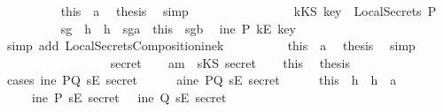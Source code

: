 \begin{isabellebody}
\ \ \ \ \ \ \ \ \isamarkupfalse%
\ this\ \ a{}\ \isamarkupfalse%
\ {\isacharquery}thesis\ \isamarkupfalse%
\ simp\isanewline
\ \ \ \ \ \ \isamarkupfalse%
\isanewline
\ \ \ \ \ \ \ \ \isamarkupfalse%
\ {\isachardoublequoteopen}kKS\ key\ {\isasymnotin}\ LocalSecrets\ P{\isachardoublequoteclose}\isanewline
\ \ \ \ \ \ \ \ \isamarkupfalse%
\ sg{}\ \ h{}\ \ h{}\ \ sg{}a\ \ this\ \ sg{}b\ \isamarkupfalse%
\ {\isachardoublequoteopen}ine\ P\ {\isacharparenleft}kE\ key{\isacharparenright}{\isachardoublequoteclose}\isanewline
\ \ \ \ \ \ \ \ \ \ \isamarkupfalse%
\ {\isacharparenleft}simp\ add{\isacharcolon}\ LocalSecretsComposition{\isacharunderscore}ine{}{\isacharunderscore}k{\isacharparenright}\isanewline
\ \ \ \ \ \ \ \ \isamarkupfalse%
\ this\ \ a{}\ \isamarkupfalse%
\ {\isacharquery}thesis\ \isamarkupfalse%
\ simp\isanewline
\ \ \ \ \ \ \isamarkupfalse%
\isanewline
\ \ \ \ \isamarkupfalse%
\isanewline
\ \ \isamarkupfalse%
\isanewline
{}\isamarkupfalse%
\isanewline
\ \ \isamarkupfalse%
\ secret\isanewline
\ \ \isamarkupfalse%
\ a{}{\isacharcolon}{\isachardoublequoteopen}m\ {\isacharequal}\ sKS\ secret{\isachardoublequoteclose}\isanewline
\ \ \isamarkupfalse%
\ this\ \isamarkupfalse%
\ {\isacharquery}thesis\isanewline
\ \ \isamarkupfalse%
\ {\isacharparenleft}cases\ {\isachardoublequoteopen}ine\ PQ\ {\isacharparenleft}sE\ secret{\isacharparenright}{\isachardoublequoteclose}{\isacharparenright}\isanewline
\ \ \ \ \isamarkupfalse%
\ a{}{}{\isacharcolon}{\isachardoublequoteopen}ine\ PQ\ {\isacharparenleft}sE\ secret{\isacharparenright}{\isachardoublequoteclose}\isanewline
\ \ \ \ \isamarkupfalse%
\ this\ \ h{}\ \ h{}\ \ a{}\ \isamarkupfalse%
\isanewline
\ \ \ \ \ {\isachardoublequoteopen}ine\ P\ {\isacharparenleft}sE\ secret{\isacharparenright}\ \ {\isasymor}\ ine\ Q\ {\isacharparenleft}sE\ secret{\isacharparenright}{\isachardoublequoteclose}\isanewline
\ \ \ \ \ \ \isamarkupfalse%

\end{isabellebody}
